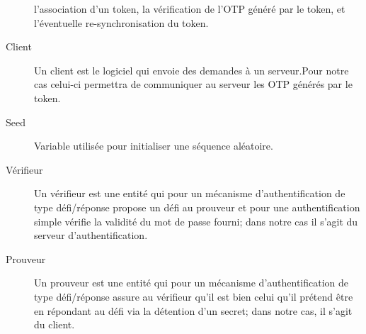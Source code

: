 \documentclass{"../../res/univ-projet"}
\begin{document}
\begin{description}
  	l'association d'un token, la vérification de l'OTP généré par 
  	le token, et l'éventuelle re-synchronisation du token.
 	\\ 
	\item[Client]
  	Un client est le logiciel qui envoie des demandes à un serveur.Pour notre 
  	cas celui-ci permettra de communiquer au serveur les OTP générés 
  	par le token.
   	\\ 
    \item[Seed] Variable utilisée pour initialiser une séquence aléatoire.
    \\
    \item[Vérifieur] Un vérifieur est une entité qui pour un mécanisme 
    d'authentification de type défi/réponse propose un défi au prouveur et pour une authentification simple vérifie la validité du mot de passe fourni; dans notre
    cas il s'agit du serveur d'authentification.
    \\
    \item[Prouveur] Un prouveur est une entité qui pour un mécanisme 
    d'authentification de type défi/réponse assure au vérifieur qu'il est bien celui qu'il
    prétend être en répondant au défi via la détention d'un secret; dans notre cas,
    il s'agit du client.
\end{description}

\end{document}
